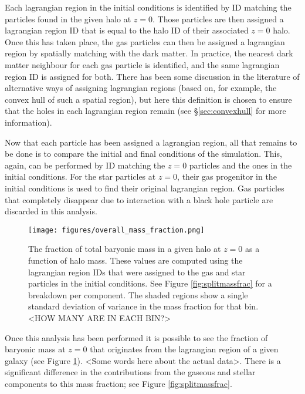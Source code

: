 Each lagrangian region in the initial conditions is identified by ID matching the particles found in the given halo at $z=0$. Those particles are then assigned a lagrangian region ID that is equal to the halo ID of their associated $z=0$ halo. Once this has taken place, the gas particles can then be assigned a lagrangian region by spatially matching with the dark matter. In practice, the nearest dark matter neighbour for each gas particle is identified, and the same lagrangian region ID is assigned for both. There has been some discussion in the literature of alternative ways of assigning lagrangian regions (based on, for example, the convex hull of such a spatial region), but here this definition is chosen to ensure that the holes in each lagrangian region remain (see \S \ref{sec:convexhull} for more information).

Now that each particle has been assigned a lagrangian region, all that remains to be done is to compare the initial and final conditions of the simulation. This, again, can be performed by ID matching the $z=0$ particles and the ones in the initial conditions. For the star particles at $z=0$, their gas progenitor in the initial conditions is used to find their original lagrangian region. Gas particles that completely disappear due to interaction with a black hole particle are discarded in this analysis.

\begin{figure}
    \centering
    \texttt{[image: figures/overall\_mass\_fraction.png]}
    \caption{The fraction of total baryonic mass in a given halo at $z=0$ as a function of halo mass. These values are computed using the lagrangian region IDs that were assigned to the gas and star particles in the initial conditions. See Figure \ref{fig:splitmassfrac} for a breakdown per component. The shaded regions show a single standard deviation of variance in the mass fraction for that bin. <HOW MANY ARE IN EACH BIN?>}
    \label{fig:massfrac}
\end{figure}

Once this analysis has been performed it is possible to see the fraction of baryonic mass at $z=0$ that originates from the lagrangian region of a given galaxy (see Figure \ref{fig:massfrac}). <Some words here about the actual data>. There is a significant difference in the contributions from the gaseous and stellar components to this mass fraction; see Figure \ref{fig:splitmassfrac}.

